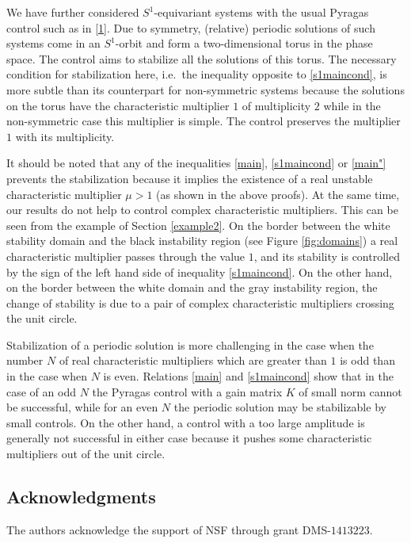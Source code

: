 \documentclass{article}
\begin{document}
We have further considered $S^1$-equivariant systems with the usual Pyragas control such as in \eqref{1}.
Due to symmetry, (relative) periodic solutions of such systems come in an $S^1$-orbit and form a two-dimensional torus in the phase space.
The control aims to stabilize all the solutions of this torus. The necessary condition for stabilization here, i.e.~the inequality opposite to \eqref{s1maincond}, is more subtle than its counterpart 
for non-symmetric systems because the solutions on the torus have the characteristic multiplier $1$ of multiplicity $2$ while in the non-symmetric case this multiplier is simple.
The control preserves the multiplier $1$ with its multiplicity.

It should be noted that any of the inequalities \eqref{main}, \eqref{s1maincond} or \eqref{main"} prevents the stabilization because it implies the existence of a real unstable characteristic multiplier $\mu>1$
(as shown in the above proofs). At the same time, our results do not help to control complex characteristic multipliers. This can be seen from the example of Section \ref{example2}.
On the border between the white stability domain and the black instability region (see Figure \ref{fig:domains}) a real characteristic multiplier passes through the value $1$, and its stability
is controlled by the sign of the left hand side of inequality \eqref{s1maincond}. On the other hand, on the border between the white domain and the gray instability region,
the change of stability is due to a pair of complex characteristic multipliers crossing the unit circle.

Stabilization of a periodic solution is more challenging in the case when the number $N$ of real characteristic multipliers which are greater than $1$ is odd than in the case when $N$ is even.
Relations \eqref{main} and \eqref{s1maincond} show that in the case of an odd $N$ the Pyragas control with a gain matrix $K$ of small norm cannot be successful, while for an even $N$ the periodic solution
may be stabilizable by small controls. On the other hand, a control with a too large amplitude is generally not successful in either case because it pushes some characteristic multipliers out of the unit circle.

\subsection*{Acknowledgments}
The authors acknowledge the support of NSF through grant DMS-$1413223$.



\end{document}

